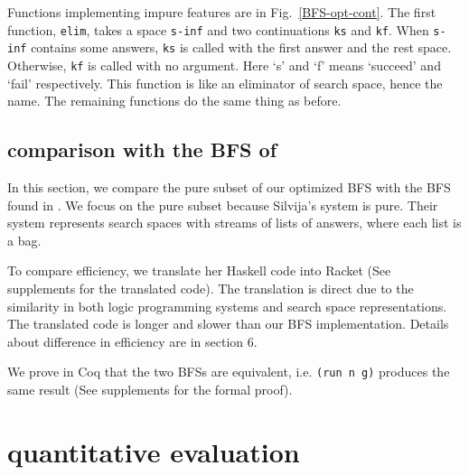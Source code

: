 \documentclass[format=acmlarge, review=true, authordraft=true]{acmart}
\begin{document}
Functions implementing impure features are in Fig.~\ref{BFS-opt-cont}. The 
first function, \texttt{elim}, takes a space \texttt{s-inf} and two 
continuations \texttt{ks} and \texttt{kf}. When \texttt{s-inf} contains some 
answers, \texttt{ks} is called with the first answer and the rest space. 
Otherwise, \texttt{kf} is called with no argument. Here `s' and `f' means 
`succeed' and `fail' respectively. This function is like an eliminator of 
search space, hence the name. The remaining functions do the same thing as 
before.

\subsection{comparison with the BFS of \citet{seres1999algebra}}

In this section, we compare the pure subset of our optimized BFS with the BFS 
found in \citet{seres1999algebra}. We focus on the pure subset because 
Silvija's system is pure. Their system represents search spaces with streams of 
lists of answers, where each list is a bag.

To compare efficiency, we translate her Haskell code into Racket (See 
supplements for the translated code). The translation is direct 
due to the similarity in both logic programming systems and search space 
representations. The translated code is longer and slower than our BFS 
implementation. Details about 
difference in efficiency are in section 6.

We prove in Coq that the two BFSs are equivalent, i.e. \texttt{(run n g)} 
produces the same result (See supplements for the formal proof).

\section{quantitative evaluation}
\end{document}
